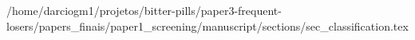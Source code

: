/home/darciogm1/projetos/bitter-pills/paper3-frequent-losers/papers_finais/paper1_screening/manuscript/sections/sec_classification.tex